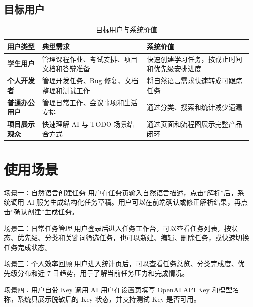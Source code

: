 \documentclass[UTF8,a4paper,12pt,fontset=fandol]{ctexart}
\begin{document}
\subsection{目标用户}

\begin{table}[H]
  \centering
  \caption{目标用户与系统价值}
  \begin{tabularx}{\linewidth}{>{\bfseries}p{2.7cm}YY}
    \toprule
    用户类型 & 典型需求 & 系统价值 \\
    \midrule
    学生用户 & 管理课程作业、考试安排、项目文档和答辩准备 & 快速创建学习任务，按截止时间和优先级安排进度 \\
    个人开发者 & 管理开发任务、Bug 修复、文档整理和测试工作 & 将自然语言需求快速转成可跟踪任务 \\
    普通办公用户 & 管理日常工作、会议事项和生活安排 & 通过分类、搜索和统计减少遗漏 \\
    项目展示观众 & 快速理解 AI 与 TODO 场景结合方式 & 通过页面和流程图展示完整产品闭环 \\
    \bottomrule
  \end{tabularx}
\end{table}

\section{使用场景}

\begin{infobox}{场景一：自然语言创建任务}
用户在任务页输入自然语言描述，点击“解析”后，系统调用 AI 服务生成结构化任务草稿。用户可以在前端确认或修正解析结果，再点击“确认创建”生成任务。
\end{infobox}

\begin{infobox}{场景二：日常任务管理}
用户登录后进入任务工作台，可以查看任务列表，按状态、优先级、分类和关键词筛选任务，也可以新建、编辑、删除任务，或快速切换任务完成状态。
\end{infobox}

\begin{infobox}{场景三：个人效率回顾}
用户进入统计页后，可以查看任务总览、分类完成度、优先级分布和近 7 日趋势，用于了解当前任务压力和完成情况。
\end{infobox}

\begin{infobox}{场景四：用户自带 Key 调用 AI}
用户在设置页填写 OpenAI API Key 和模型名称，系统只展示脱敏后的 Key 状态，并支持测试 Key 是否可用。
\end{infobox}
\end{document}
